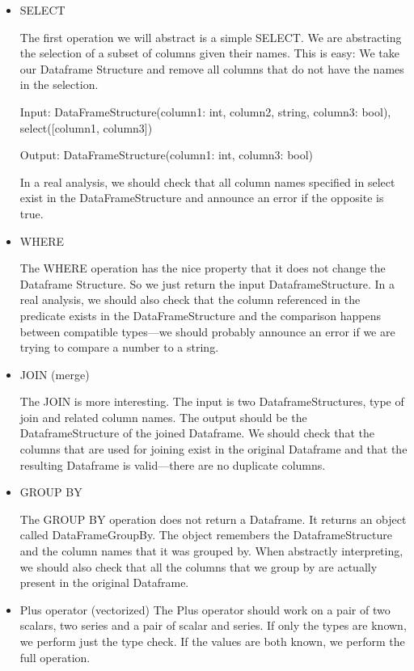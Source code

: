 \begin{itemize}
    \item SELECT

    The first operation we will abstract is a simple SELECT\@.
    We are abstracting the selection of a subset of columns given their names.
    This is easy: We take our Dataframe Structure and remove all columns that do not have the names in the selection.
    \begin{example}

        Input: DataFrameStructure(column1: int, column2, string, column3: bool), select([column1, column3])

        Output: DataFrameStructure(column1: int, column3: bool)
    \end{example}
    In a real analysis, we should check that all column names specified in select exist in the DataFrameStructure and
    announce an error if the opposite is true.

    \item WHERE

    The WHERE operation has the nice property that it does not change the Dataframe Structure.
    So we just return the input DataframeStructure.
    In a real analysis, we should also check that the column referenced in the predicate exists in the DataFrameStructure
    and the comparison happens between compatible types---we should probably announce an error if we are trying to compare
    a number to a string.

    \item JOIN (merge)

    The JOIN is more interesting.
    The input is two DataframeStructures, type of join and related column names.
    The output should be the DataframeStructure of the joined Dataframe.
    We should check that the columns that are used for joining exist in the original Dataframe and that the resulting
    Dataframe is valid---there are no duplicate columns.

    \item GROUP BY 

    The GROUP BY operation does not return a Dataframe.
    It returns an object called DataFrameGroupBy.
    The object remembers the DataframeStructure and the column names that it was grouped by.
    When abstractly interpreting, we should also check that all the columns that we group by are actually present in the
    original Dataframe.

    \item Plus operator (vectorized)
    The Plus operator should work on a pair of two scalars, two series and a pair of scalar and series.
    If only the types are known, we perform just the type check.
    If the values are both known, we perform the full operation.

\end{itemize}


